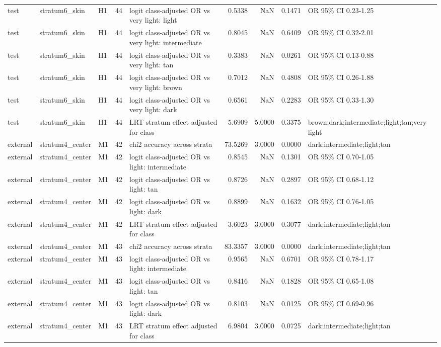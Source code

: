 \begin{tabular}{lllrlrrrl}
test & stratum6\_skin & H1 & 44 & logit class-adjusted OR vs very light: light & 0.5338 & NaN & 0.1471 & OR 95\% CI 0.23-1.25 \\
test & stratum6\_skin & H1 & 44 & logit class-adjusted OR vs very light: intermediate & 0.8045 & NaN & 0.6409 & OR 95\% CI 0.32-2.01 \\
test & stratum6\_skin & H1 & 44 & logit class-adjusted OR vs very light: tan & 0.3383 & NaN & 0.0261 & OR 95\% CI 0.13-0.88 \\
test & stratum6\_skin & H1 & 44 & logit class-adjusted OR vs very light: brown & 0.7012 & NaN & 0.4808 & OR 95\% CI 0.26-1.88 \\
test & stratum6\_skin & H1 & 44 & logit class-adjusted OR vs very light: dark & 0.6561 & NaN & 0.2283 & OR 95\% CI 0.33-1.30 \\
test & stratum6\_skin & H1 & 44 & LRT stratum effect adjusted for class & 5.6909 & 5.0000 & 0.3375 & brown;dark;intermediate;light;tan;very light \\
external & stratum4\_center & M1 & 42 & chi2 accuracy across strata & 73.5269 & 3.0000 & 0.0000 & dark;intermediate;light;tan \\
external & stratum4\_center & M1 & 42 & logit class-adjusted OR vs light: intermediate & 0.8545 & NaN & 0.1301 & OR 95\% CI 0.70-1.05 \\
external & stratum4\_center & M1 & 42 & logit class-adjusted OR vs light: tan & 0.8726 & NaN & 0.2897 & OR 95\% CI 0.68-1.12 \\
external & stratum4\_center & M1 & 42 & logit class-adjusted OR vs light: dark & 0.8899 & NaN & 0.1632 & OR 95\% CI 0.76-1.05 \\
external & stratum4\_center & M1 & 42 & LRT stratum effect adjusted for class & 3.6023 & 3.0000 & 0.3077 & dark;intermediate;light;tan \\
external & stratum4\_center & M1 & 43 & chi2 accuracy across strata & 83.3357 & 3.0000 & 0.0000 & dark;intermediate;light;tan \\
external & stratum4\_center & M1 & 43 & logit class-adjusted OR vs light: intermediate & 0.9565 & NaN & 0.6701 & OR 95\% CI 0.78-1.17 \\
external & stratum4\_center & M1 & 43 & logit class-adjusted OR vs light: tan & 0.8416 & NaN & 0.1828 & OR 95\% CI 0.65-1.08 \\
external & stratum4\_center & M1 & 43 & logit class-adjusted OR vs light: dark & 0.8103 & NaN & 0.0125 & OR 95\% CI 0.69-0.96 \\
external & stratum4\_center & M1 & 43 & LRT stratum effect adjusted for class & 6.9804 & 3.0000 & 0.0725 & dark;intermediate;light;tan \\

\end{tabular}
